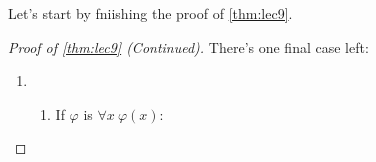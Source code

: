 Let's start by fniishing the proof of \autoref{thm:lec9}.

\begin{proof}[Proof of \autoref{thm:lec9} (Continued)]
	There's one final case left:
	\begin{enumerate}
		\item[] \begin{enumerate}\setcounter{enumii}{\thestoppedhere}
				\item If \(\varphi \) is \(\forall x\ \varphi (x)\):
			\end{enumerate}
	\end{enumerate}
\end{proof}